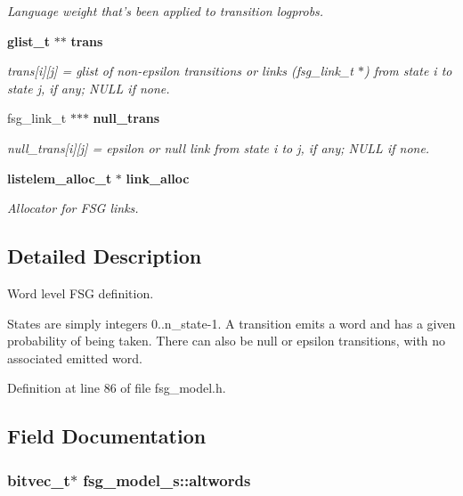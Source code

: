 \begin{CompactItemize}
\begin{CompactList}\small\item\em Language weight that's been applied to transition logprobs. \item\end{CompactList}\item 
{\bf glist\_\-t} $\ast$$\ast$ {\bf trans}
\begin{CompactList}\small\item\em trans[i][j] = glist of non-epsilon transitions or links (fsg\_\-link\_\-t $\ast$) from state i to state j, if any; NULL if none. \item\end{CompactList}\item 
fsg\_\-link\_\-t $\ast$$\ast$$\ast$ {\bf null\_\-trans}
\begin{CompactList}\small\item\em null\_\-trans[i][j] = epsilon or null link from state i to j, if any; NULL if none. \item\end{CompactList}\item 
{\bf listelem\_\-alloc\_\-t} $\ast$ {\bf link\_\-alloc}
\begin{CompactList}\small\item\em Allocator for FSG links. \item\end{CompactList}\end{CompactItemize}


\subsection{Detailed Description}
Word level FSG definition. 

States are simply integers 0..n\_\-state-1. A transition emits a word and has a given probability of being taken. There can also be null or epsilon transitions, with no associated emitted word. 

Definition at line 86 of file fsg\_\-model.h.

\subsection{Field Documentation}
\subsubsection[{altwords}]{\setlength{\rightskip}{0pt plus 5cm}bitvec\_\-t$\ast$ {\bf fsg\_\-model\_\-s::altwords}}\label{structfsg__model__s_db51d840853d7ef3315bd833cddeb748}


